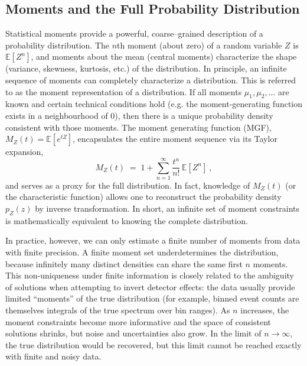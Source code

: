     \subsection{Moments and the Full Probability Distribution}
        Statistical moments provide a powerful, coarse--grained description of a probability distribution.
        The $n$th moment (about zero) of a random variable $Z$ is $\mathbb{E}[Z^n]$, and moments about the mean (central moments) characterize the shape (variance, skewness, kurtosis, etc.) of the distribution.
        In principle, an infinite sequence of moments can completely characterize a distribution.
        This is referred to as the moment representation of a distribution.
        If all moments ${\mu_1, \mu_2, \dots}$ are known and certain technical conditions hold (e.g. the moment-generating function exists in a neighbourhood of 0), then there is a unique probability density consistent with those moments.
        The moment generating function (MGF), $M_Z(t) = \mathbb{E}[e^{tZ}]$, encapsulates the entire moment sequence via its Taylor expansion,
        \[
            M_Z(t) \;=\; 1 + \sum_{n=1}^\infty \frac{t^n}{n!}\,\mathbb{E}[Z^n]~,
        \]
        and serves as a proxy for the full distribution.
        In fact, knowledge of $M_Z(t)$ (or the characteristic function) allows one to reconstruct the probability density $p_Z(z)$ by inverse transformation.
        In short, an infinite set of moment constraints is mathematically equivalent to knowing the complete distribution.

        In practice, however, we can only estimate a finite number of moments from data with finite precision.
        A finite moment set underdetermines the distribution, because infinitely many distinct densities can share the same first $n$ moments.
        This non-uniqueness under finite information is closely related to the ambiguity of solutions when attempting to invert detector effects: the data usually provide limited “moments” of the true distribution (for example, binned event counts are themselves integrals of the true spectrum over bin ranges).
        As $n$ increases, the moment constraints become more informative and the space of consistent solutions shrinks, but noise and uncertainties also grow.
        In the limit of $n\to\infty$, the true distribution would be recovered, but this limit cannot be reached exactly with finite and noisy data.

